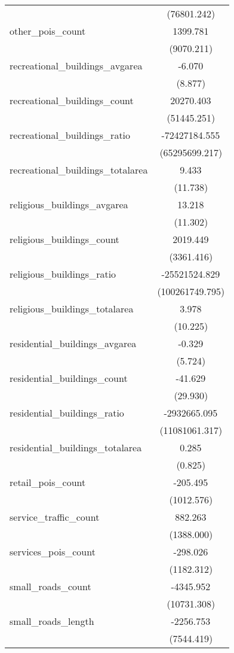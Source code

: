 \begin{table}[!htbp]
\begin{tabular}{@{\extracolsep{5pt}}lc}
  & (76801.242) \\
 other_pois_count & 1399.781$^{}$ \\
  & (9070.211) \\
 recreational_buildings_avgarea & -6.070$^{}$ \\
  & (8.877) \\
 recreational_buildings_count & 20270.403$^{}$ \\
  & (51445.251) \\
 recreational_buildings_ratio & -72427184.555$^{}$ \\
  & (65295699.217) \\
 recreational_buildings_totalarea & 9.433$^{}$ \\
  & (11.738) \\
 religious_buildings_avgarea & 13.218$^{}$ \\
  & (11.302) \\
 religious_buildings_count & 2019.449$^{}$ \\
  & (3361.416) \\
 religious_buildings_ratio & -25521524.829$^{}$ \\
  & (100261749.795) \\
 religious_buildings_totalarea & 3.978$^{}$ \\
  & (10.225) \\
 residential_buildings_avgarea & -0.329$^{}$ \\
  & (5.724) \\
 residential_buildings_count & -41.629$^{}$ \\
  & (29.930) \\
 residential_buildings_ratio & -2932665.095$^{}$ \\
  & (11081061.317) \\
 residential_buildings_totalarea & 0.285$^{}$ \\
  & (0.825) \\
 retail_pois_count & -205.495$^{}$ \\
  & (1012.576) \\
 service_traffic_count & 882.263$^{}$ \\
  & (1388.000) \\
 services_pois_count & -298.026$^{}$ \\
  & (1182.312) \\
 small_roads_count & -4345.952$^{}$ \\
  & (10731.308) \\
 small_roads_length & -2256.753$^{}$ \\
  & (7544.419) \\

\end{tabular}
\end{table}
